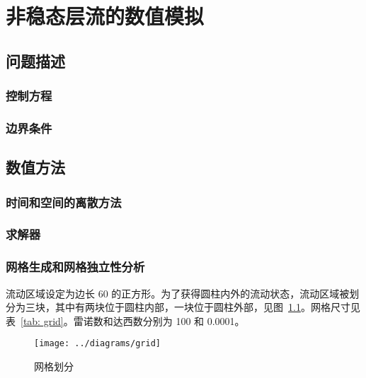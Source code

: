 \chapter{非稳态层流的数值模拟}

\section{问题描述}

\subsection{控制方程} %

\subsection{边界条件} %

\section{数值方法}

\subsection{时间和空间的离散方法}

\subsection{求解器} %

\subsection{网格生成和网格独立性分析}

流动区域设定为边长 60 的正方形。为了获得圆柱内外的流动状态，流动区域被划分为三块，其中有两块位于圆柱内部，一块位于圆柱外部，见图~\ref{fig: grid}。网格尺寸见表~\ref{tab: grid}。雷诺数和达西数分别为 100 和 0.0001。
\begin{figure}
	\centering
	\texttt{[image: ../diagrams/grid]}
	\caption{网格划分}\label{fig: grid}
\end{figure}

